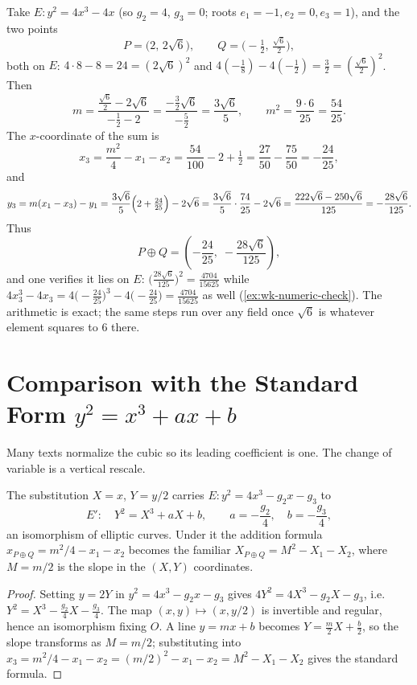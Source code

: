 Take \(E : y^2 = 4x^3 - 4x\) (so \(g_2 = 4\), \(g_3 = 0\); roots
\(e_1 = -1, e_2 = 0, e_3 = 1\)), and the two points
\[
  P = \bigl( 2,\, 2\sqrt6 \bigr), \qquad Q = \bigl( -\tfrac12,\, \tfrac{\sqrt6}{2} \bigr),
\]
both on \(E\): \(4\cdot 8 - 8 = 24 = (2\sqrt6)^2\) and
\(4(-\tfrac18) - 4(-\tfrac12) = \tfrac32 = (\tfrac{\sqrt6}{2})^2\). Then
\[
  m = \frac{\tfrac{\sqrt6}{2} - 2\sqrt6}{-\tfrac12 - 2}
    = \frac{-\tfrac32\sqrt6}{-\tfrac52} = \frac{3\sqrt6}{5},
  \qquad m^2 = \frac{9 \cdot 6}{25} = \frac{54}{25}.
\]
The \(x\)-coordinate of the sum is
\[
  x_3 = \frac{m^2}{4} - x_1 - x_2 = \frac{54}{100} - 2 + \tfrac12
      = \frac{27}{50} - \frac{75}{50} = -\frac{24}{25},
\]
and
\[
  y_3 = m(x_1 - x_3) - y_1
      = \frac{3\sqrt6}{5}\Bigl( 2 + \tfrac{24}{25} \Bigr) - 2\sqrt6
      = \frac{3\sqrt6}{5}\cdot\frac{74}{25} - 2\sqrt6
      = \frac{222\sqrt6 - 250\sqrt6}{125}
      = -\frac{28\sqrt6}{125}.
\]
Thus
\[
  P \oplus Q = \left( -\frac{24}{25},\; -\frac{28\sqrt6}{125} \right),
\]
and one verifies it lies on \(E\): \(\bigl(\tfrac{28\sqrt6}{125}\bigr)^2 =
\tfrac{4704}{15625}\) while \(4x_3^3 - 4x_3 = 4\bigl(-\tfrac{24}{25}\bigr)^3 -
4\bigl(-\tfrac{24}{25}\bigr) = \tfrac{4704}{15625}\) as well
(\cref{ex:wk-numeric-check}). The arithmetic is exact; the same steps run over any
field once \(\sqrt6\) is whatever element squares to \(6\) there.

\section{Comparison with the Standard Form \texorpdfstring{$y^2 = x^3 + ax + b$}{y2=x3+ax+b}}
\label{sec:wk-standard}

Many texts normalize the cubic so its leading coefficient is one. The change of
variable is a vertical rescale.

\begin{proposition}
\label{prop:wk-standard}
The substitution \(X = x\), \(Y = y/2\) carries \(E : y^2 = 4x^3 - g_2 x - g_3\)
to
\[
  E' : \quad Y^2 = X^3 + aX + b, \qquad a = -\frac{g_2}{4}, \quad b = -\frac{g_3}{4},
\]
an isomorphism of elliptic curves. Under it the addition formula
\(x_{P\oplus Q} = m^2/4 - x_1 - x_2\) becomes the familiar
\(X_{P\oplus Q} = M^2 - X_1 - X_2\), where \(M = m/2\) is the slope in the
\((X,Y)\) coordinates.
\end{proposition}

\begin{proof}
Setting \(y = 2Y\) in \(y^2 = 4x^3 - g_2 x - g_3\) gives \(4Y^2 = 4X^3 - g_2 X -
g_3\), i.e.\ \(Y^2 = X^3 - \tfrac{g_2}{4}X - \tfrac{g_3}{4}\). The map
\((x,y) \mapsto (x, y/2)\) is invertible and regular, hence an isomorphism fixing
\(O\). A line \(y = mx + b\) becomes \(Y = \tfrac{m}{2}X + \tfrac{b}{2}\), so the
slope transforms as \(M = m/2\); substituting into \(x_3 = m^2/4 - x_1 - x_2 =
(m/2)^2 - x_1 - x_2 = M^2 - X_1 - X_2\) gives the standard formula.
\end{proof}

